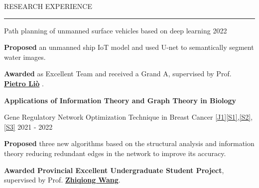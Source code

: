 \documentclass{resume} %
\renewenvironment{rSection}[1]{
\sectionskip
\textcolor{TsinghuaPurple}{\MakeUppercase{#1}}
\sectionlineskip
\hrule
\begin{list}{}{
\setlength{\leftmargin}{0em}
}
\item[]
}{
\end{list}
}
\begin{document}
\begin{rSection}{RESEARCH EXPERIENCE}
\begin{rSubsection}{Path planning of unmanned surface vehicles based on deep learning} {2022}{}{}
    \item \textbf{Proposed} an unmanned ship IoT model and used U-net to semantically segment water images.
    \item \textbf{Awarded} as Excellent Team and received a Grand A, supervised by Prof. \href{https://scholar.google.com/citations?user=4YhNJBEAAAAJ&hl=en}{\textbf{Pietro Liò}}  .
\end{rSubsection} 
\vspace{5pt}
\textbf{\large{\textcolor{darkpurple}{Applications of Information Theory and Graph Theory in Biology}}}\vspace{5pt}\\
\begin{rSubsection}{Gene Regulatory Network Optimization Technique in Breast Cancer \hyperref[j1]{[J1]}\hyperref[s1]{[S1]},\hyperref[s2]{[S2]},\hyperref[s3]{[S3]}} {2021 - 2022}{}{}
    \item \textbf{Proposed} three new algorithms based on the structural analysis and information theory reducing redundant edges in the network to improve its accuracy.
    \item \textbf{Awarded Provincial Excellent Undergraduate Student Project}, supervised by Prof. \href{https://scholar.google.com/citations?hl=zh-CN&user=QKrGYo4AAAAJ}{\textbf{Zhiqiong Wang}}.
\end{rSubsection}  
\end{rSection} 
\end{document}
